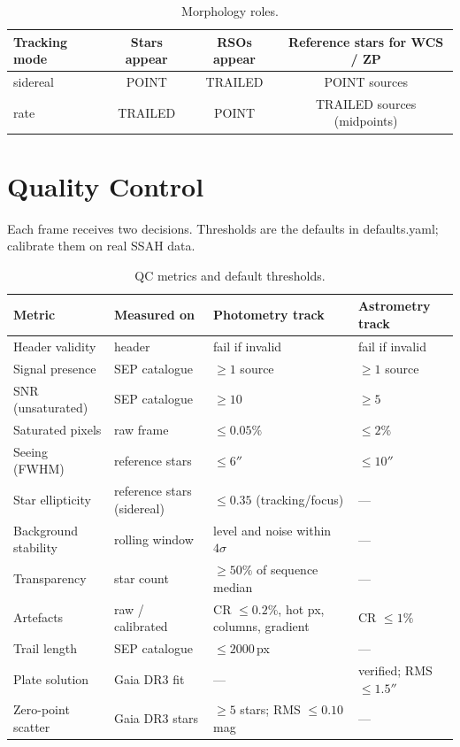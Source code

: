 \documentclass[11pt,a4paper]{article}
\newcommand{\brkus}{\textunderscore\allowbreak}
\newcommand{\code}[1]{{\ttfamily\let\_\brkus #1}}
\begin{document}
\begin{table}[H]
\centering\small
\begin{tabular}{@{}lccc@{}}
\toprule
\textbf{Tracking mode} & \textbf{Stars appear} & \textbf{RSOs appear} & \textbf{Reference stars for WCS / ZP} \\
\midrule
\code{sidereal} & POINT & TRAILED & POINT sources \\
\code{rate}     & TRAILED & POINT & TRAILED sources (midpoints) \\
\bottomrule
\end{tabular}
\caption{Morphology roles.}
\end{table}

\section{Quality Control}

Each frame receives two decisions. Thresholds are the defaults in \code{defaults.\allowbreak yaml};
calibrate them on real SSAH data.

\begin{table}[H]
\centering\small
\begin{tabularx}{\textwidth}{@{}p{35mm}p{30mm}LL@{}}
\toprule
\textbf{Metric} & \textbf{Measured on} & \textbf{Photometry track} & \textbf{Astrometry track} \\
\midrule
Header validity & header & fail if invalid & fail if invalid \\
Signal presence & SEP catalogue & $\geq 1$ source & $\geq 1$ source \\
SNR (unsaturated) & SEP catalogue & $\geq 10$ & $\geq 5$ \\
Saturated pixels & raw frame & $\leq 0.05\%$ & $\leq 2\%$ \\
Seeing (FWHM) & reference stars & $\leq 6''$ & $\leq 10''$ \\
Star ellipticity & reference stars (sidereal) & $\leq 0.35$ (tracking/focus) & --- \\
Background stability & rolling window & level and noise within $4\sigma$ & --- \\
Transparency & star count & $\geq 50\%$ of sequence median & --- \\
Artefacts & raw / calibrated & CR $\leq 0.2\%$, hot px, columns, gradient & CR $\leq 1\%$ \\
Trail length & SEP catalogue & $\leq 2000$\,px & --- \\
Plate solution & Gaia DR3 fit & --- & verified; RMS $\leq 1.5''$ \\
Zero-point scatter & Gaia DR3 stars & $\geq 5$ stars; RMS $\leq 0.10$ mag & --- \\
\bottomrule
\end{tabularx}
\caption{QC metrics and default thresholds.}
\end{table}
\end{document}
